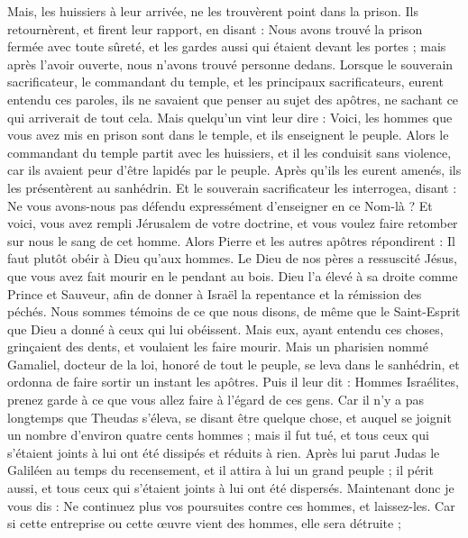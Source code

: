 \begin{multicols}{2}
Mais, les huissiers à leur arrivée, ne les trouvèrent point dans la prison. Ils retournèrent, et firent leur rapport,
en disant : Nous avons trouvé la prison fermée avec toute sûreté, et les gardes aussi qui étaient devant les portes ; mais après l'avoir ouverte, nous n'avons trouvé personne dedans.
Lorsque le souverain sacrificateur, le commandant du temple, et les principaux sacrificateurs, eurent entendu ces paroles, ils ne savaient que penser au sujet des apôtres, ne sachant ce qui arriverait de tout cela.
Mais quelqu'un vint leur dire : Voici, les hommes que vous avez mis en prison sont dans le temple, et ils enseignent le peuple.
Alors le commandant du temple partit avec les huissiers, et il les conduisit sans violence, car ils avaient peur d'être lapidés par le peuple.
Après qu’ils les eurent amenés, ils les présentèrent au sanhédrin. Et le souverain sacrificateur les interrogea,
disant : Ne vous avons-nous pas défendu expressément d'enseigner en ce Nom-là ? Et voici, vous avez rempli Jérusalem de votre doctrine, et vous voulez faire retomber sur nous le sang de cet homme.
Alors Pierre et les autres apôtres répondirent : Il faut plutôt obéir à Dieu qu'aux hommes.
Le Dieu de nos pères a ressuscité Jésus, que vous avez fait mourir en le pendant au bois.
Dieu l’a élevé à sa droite comme Prince et Sauveur, afin de donner à Israël la repentance et la rémission des péchés.
Nous sommes témoins de ce que nous disons, de même que le Saint-Esprit que Dieu a donné à ceux qui lui obéissent.
Mais eux, ayant entendu ces choses, grinçaient des dents, et voulaient les faire mourir.
Mais un pharisien nommé Gamaliel, docteur de la loi, honoré de tout le peuple, se leva dans le sanhédrin, et ordonna de faire sortir un instant les apôtres.
Puis il leur dit : Hommes Israélites, prenez garde à ce que vous allez faire à l’égard de ces gens.
Car il n’y a pas longtemps que Theudas s'éleva, se disant être quelque chose, et auquel se joignit un nombre d’environ quatre cents hommes ; mais il fut tué, et tous ceux qui s'étaient joints à lui ont été dissipés et réduits à rien.
Après lui parut Judas le Galiléen au temps du recensement, et il attira à lui un grand peuple ; il périt aussi, et tous ceux qui s'étaient joints à lui ont été dispersés.
Maintenant donc je vous dis : Ne continuez plus vos poursuites contre ces hommes, et laissez-les. Car si cette entreprise ou cette œuvre vient des hommes, elle sera détruite ;

\end{multicols}
